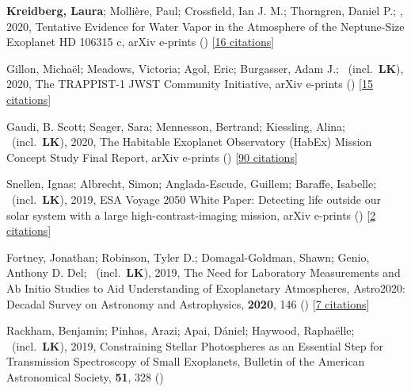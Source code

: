 \item[{\color{numcolor}\scriptsize11}] \textbf{Kreidberg, Laura}; Molli{\`e}re, Paul; Crossfield, Ian J. M.; Thorngren, Daniel P.; \etal, 2020, Tentative Evidence for Water Vapor in the Atmosphere of the Neptune-Size Exoplanet HD 106315 c, arXiv e-prints () [\href{https://ui.adsabs.harvard.edu/abs/2020arXiv200607444K}{16 citations}]

\item[{\color{numcolor}\scriptsize10}] Gillon, Micha{\"e}l; Meadows, Victoria; Agol, Eric; Burgasser, Adam J.; \etal\ (incl.\ \textbf{LK}), 2020, The TRAPPIST-1 JWST Community Initiative, arXiv e-prints () [\href{https://ui.adsabs.harvard.edu/abs/2020arXiv200204798G}{15 citations}]

\item[{\color{numcolor}\scriptsize9}] Gaudi, B. Scott; Seager, Sara; Mennesson, Bertrand; Kiessling, Alina; \etal\ (incl.\ \textbf{LK}), 2020, The Habitable Exoplanet Observatory (HabEx) Mission Concept Study Final Report, arXiv e-prints () [\href{https://ui.adsabs.harvard.edu/abs/2020arXiv200106683G}{90 citations}]

\item[{\color{numcolor}\scriptsize8}] Snellen, Ignas; Albrecht, Simon; Anglada-Escude, Guillem; Baraffe, Isabelle; \etal\ (incl.\ \textbf{LK}), 2019, ESA Voyage 2050 White Paper: Detecting life outside our solar system with a large high-contrast-imaging mission, arXiv e-prints () [\href{https://ui.adsabs.harvard.edu/abs/2019arXiv190801803S}{2 citations}]

\item[{\color{numcolor}\scriptsize7}] Fortney, Jonathan; Robinson, Tyler D.; Domagal-Goldman, Shawn; Genio, Anthony D. Del; \etal\ (incl.\ \textbf{LK}), 2019, The Need for Laboratory Measurements and Ab Initio Studies to Aid Understanding of Exoplanetary Atmospheres, Astro2020: Decadal Survey on Astronomy and Astrophysics, \textbf{2020}, 146 () [\href{https://ui.adsabs.harvard.edu/abs/2019astro2020T.146F}{7 citations}]

\item[{\color{numcolor}\scriptsize6}] Rackham, Benjamin; Pinhas, Arazi; Apai, D{\'a}niel; Haywood, Rapha{\"e}lle; \etal\ (incl.\ \textbf{LK}), 2019, Constraining Stellar Photospheres as an Essential Step for Transmission Spectroscopy of Small Exoplanets, Bulletin of the American Astronomical Society, \textbf{51}, 328 ()

